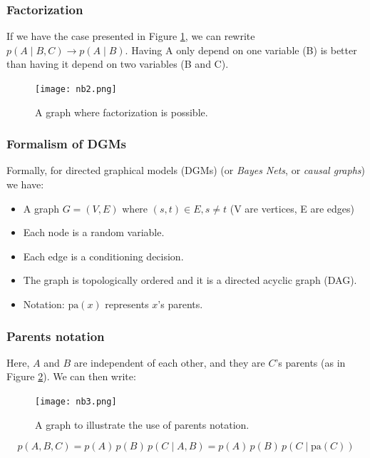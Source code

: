 \documentclass{article}
\begin{document}
\subsubsection{Factorization}
If we have the case presented in Figure \ref{fig:nb2}, we can rewrite $p(A \mid B, C) \rightarrow p(A \mid B)$.
Having A only depend on one variable (B) is better than having it depend on two variables (B and C).
\begin{figure}[!ht]
    \centering
    \texttt{[image: nb2.png]}
    \caption{A graph where factorization is possible.}
    \label{fig:nb2}
\end{figure}


\subsubsection{Formalism of DGMs}
\noindent
Formally, for directed graphical models (DGMs) (or \emph{Bayes Nets}, or \emph{causal graphs}) we have:
\begin{itemize}
\item A graph $G=(V, E)$ where $(s, t) \in E, s \neq t$ (V are vertices, E are edges)
\item Each node is a random variable.
\item Each edge is a conditioning decision.
\item The graph is topologically ordered and it is a directed acyclic graph (DAG).
\item Notation: $\mathrm{pa}(x)$ represents $x$'s parents.
\end{itemize}

\subsubsection{Parents notation}
Here, $A$ and $B$ are independent of each other, and they are $C$'s parents (as in Figure \ref{fig:nb3}). We can then write:
\begin{figure}[!ht]
    \centering
    \texttt{[image: nb3.png]}
    \caption{A graph to illustrate the use of parents notation.}
    \label{fig:nb3}
\end{figure}
\[
p(A, B, C) = p(A)\, p(B)\, p(C \mid A, B) = p(A) \, p(B) \, p(C \mid \mathrm{pa}(C))
\]
\end{document}
